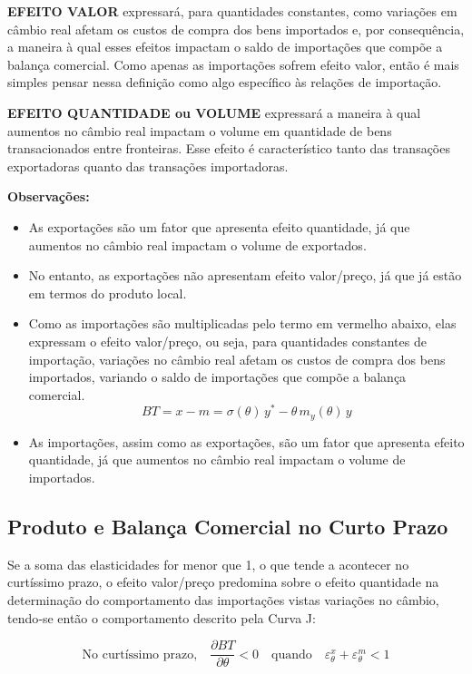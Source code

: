\documentclass[a4paper,12pt]{article}[abntex2]
\begin{document}
\textbf{EFEITO VALOR} expressará, para quantidades constantes, como variações em câmbio real afetam os custos de compra dos bens importados e, por consequência, a maneira à qual esses efeitos impactam o saldo de importações que compõe a balança comercial. Como apenas as importações sofrem efeito valor, então é mais simples pensar nessa definição como algo específico às relações de importação.

\textbf{EFEITO QUANTIDADE ou VOLUME} expressará a maneira à qual aumentos no câmbio real impactam o volume em quantidade de bens transacionados entre fronteiras. Esse efeito é característico tanto das transações exportadoras quanto das transações importadoras.

\textbf{Observações:}
\begin{itemize}
  \item As exportações são um fator que apresenta efeito quantidade, já que aumentos no câmbio real impactam o volume de exportados.
  \item No entanto, as exportações não apresentam efeito valor/preço, já que já estão em termos do produto local.
  \item Como as importações são multiplicadas pelo termo em vermelho abaixo, elas expressam o efeito valor/preço, ou seja, para quantidades constantes de importação, variações no câmbio real afetam os custos de compra dos bens importados, variando o saldo de importações que compõe a balança comercial.  
  \[
    BT = x - m = \sigma(\theta)\,y^* - \theta\,m_{y}(\theta)\,y
  \]
  \item As importações, assim como as exportações, são um fator que apresenta efeito quantidade, já que aumentos no câmbio real impactam o volume de importados.
\end{itemize}

\subsection{\textbf{Produto e Balança Comercial no Curto Prazo}}

Se a soma das elasticidades for menor que 1, o que tende a acontecer no curtíssimo prazo, o efeito valor/preço predomina sobre o efeito quantidade na determinação do comportamento das importações vistas variações no câmbio, tendo‐se então o comportamento descrito pela Curva J:

\[
\text{No curtíssimo prazo,}\quad
\frac{\partial BT}{\partial \theta} < 0
\quad\text{quando}\quad
\varepsilon^{x}_{\theta} + \varepsilon^{m}_{\theta} < 1
\]
\end{document}
